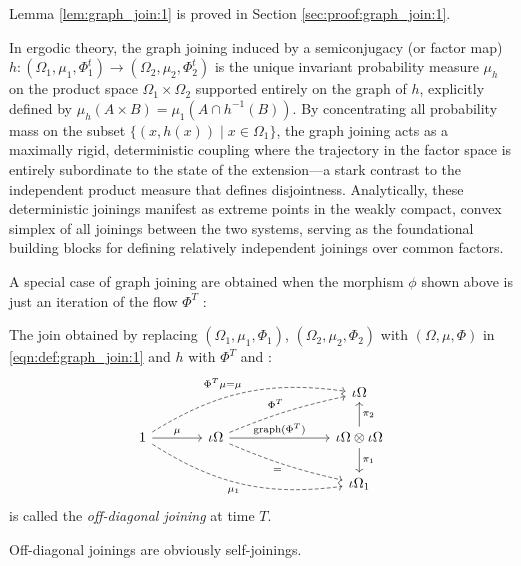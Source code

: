 \documentclass[12pt,oneside,pb-diagram]{article}
\DeclareMathOperator{\graph}{graph}
\begin{document}
Lemma \ref{lem:graph_join:1} is proved in Section \ref{sec:proof:graph_join:1}. 

\begin{Erg}{}{} 
	In ergodic theory, the graph joining induced by a semiconjugacy (or factor map) $h: (\Omega_1, \mu_1, \Phi_1^t) \to (\Omega_2, \mu_2, \Phi_2^t)$ is the unique invariant probability measure $\mu_h$ on the product space $\Omega_1 \times \Omega_2$ supported entirely on the graph of $h$, explicitly defined by $\mu_h(A \times B) = \mu_1(A \cap h^{-1}(B))$. By concentrating all probability mass on the subset $\{(x, h(x)) \mid x \in \Omega_1\}$, the graph joining acts as a maximally rigid, deterministic coupling where the trajectory in the factor space is entirely subordinate to the state of the extension—a stark contrast to the independent product measure that defines disjointness. Analytically, these deterministic joinings manifest as extreme points in the weakly compact, convex simplex of all joinings between the two systems, serving as the foundational building blocks for defining relatively independent joinings over common factors.
\end{Erg}

A special case of graph joining are obtained when the morphism $\phi$ shown above is just an iteration of the flow $\Phi^T$ :

\begin{definition}  \label{def:off_diag_join}
	\cite[Sec 6.1]{glasner2015join} The join obtained by replacing $(\Omega_1, \mu_1, \Phi_1)$, $(\Omega_2, \mu_2, \Phi_2)$ with $(\Omega, \mu, \Phi)$ in \eqref{eqn:def:graph_join:1} and $h$ with $\Phi^T$ and :
	\begin{equation} \label{eqn:def:off_diag_join}
		\begin{tikzcd} [column sep = large]
			& && \iota \Omega\\
			1 \arrow[urrr, bend left=20, "\Phi^T\mu = \mu", dashed] \arrow[drrr, bend right=20, "\mu_1"', dashed] \arrow[r, "\mu"] & \iota \Omega  \arrow[bend left=5, urr, "\Phi^T", dashed] \arrow[drr, bend right=5, "="', dashed] \arrow[rr, "\graph(\Phi^T)"] && \iota \Omega \otimes \iota \Omega \arrow[d, "\pi_1"] \arrow[u, "\pi_2"'] \\
			& && \iota \Omega_1
		\end{tikzcd}
	\end{equation}
	is called the \textit{off-diagonal joining} at time $T$.
\end{definition}

Off-diagonal joinings are obviously self-joinings. 
\end{document}
